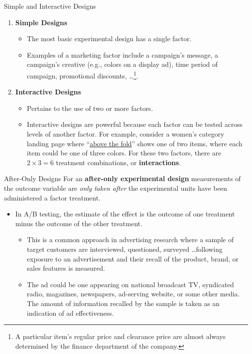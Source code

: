 \documentclass[pdf]{beamer}
\newcommand{\empr}[1]{{\color{franklinblue}\textbf{#1}}}
\theoremstyle{remark}
\theoremstyle{definition}
\begin{document}
\begin{frame}[t]{Simple and Interactive Designs}
\begin{enumerate}
\item \empr{Simple Designs}
\begin{itemize}
\item The most basic experimental design has a single factor.
\item Examples of a marketing factor include a campaign's message, a campaign's creative (e.g., colors on a display ad), time period of campaign, promotional discounts, \ldots \footnote{A particular item's regular price and clearance price are almost always determined by the finance department of the company.}.
\end{itemize}
\item \empr{Interactive Designs}
\begin{itemize}
\item  Pertains to the use of two or more factors. 
\item Interactive designs are powerful because each factor can be tested across levels of another factor.  For example, consider a women's category landing page where ``\href{https://www.abtasty.com/blog/above-the-fold/}{above the fold}'' shows one of two items, where each item could be one of three colors.  For these two factors, there are $2 \times 3 = 6$ treatment combinations, or \empr{interactions}. 
\end{itemize}
\end{enumerate}
\end{frame}

\begin{frame}[t]{After-Only Designs}
For an \empr{after-only experimental design} measurements of the outcome variable are \textit{only taken after} the experimental units have been administered a factor treatment. 
\begin{itemize}
\item In A/B testing, the estimate of the effect is the outcome of one treatment minus the outcome of the other treatment.
\begin{itemize}
\item This is a common approach in advertising research where a sample of target customers are interviewed, questioned, surveyed \ldots following exposure to an advertisement and their recall of the product, brand, or sales features is measured. 
\item The ad could be one appearing on national broadcast TV, syndicated radio, magazines, newspapers, ad-serving website, or some other media. The amount of information recalled by the sample is taken as an indication of ad effectiveness.
\end{itemize}
\end{itemize}
\end{frame}
\end{document}

